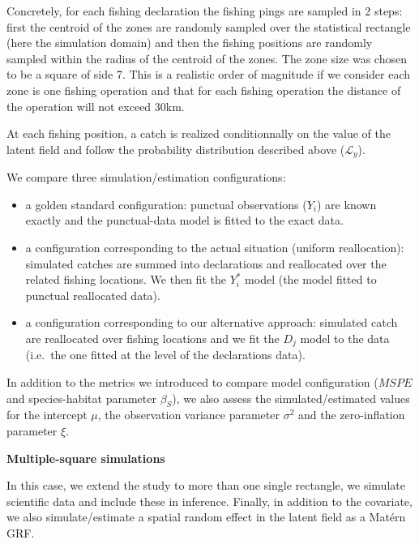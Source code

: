 \documentclass[
  english,
  man,floatsintext]{apa6}
\begin{document}
Concretely, for each fishing declaration the fishing pings are sampled in 2 steps: first the centroid of the zones are randomly sampled over the statistical rectangle (here the simulation domain) and then the fishing positions are randomly sampled within the radius of the centroid of the zones. The zone size was chosen to be a square of side 7. This is a realistic order of magnitude if we consider each zone is one fishing operation and that for each fishing operation the distance of the operation will not exceed 30km.

At each fishing position, a catch is realized conditionnally on the value of the latent field and follow the probability distribution described above (\(\mathcal{L}_y\)).

We compare three simulation/estimation configurations:

\begin{itemize}
\item
  a golden standard configuration: punctual observations (\(Y_i\)) are known exactly and the punctual-data model is fitted to the exact data.
\item
  a configuration corresponding to the actual situation (uniform reallocation): simulated catches are summed into declarations and reallocated over the related fishing locations. We then fit the \(Y_i^*\) model (the model fitted to punctual reallocated data).
\item
  a configuration corresponding to our alternative approach: simulated catch are reallocated over fishing locations and we fit the \(D_j\) model to the data (i.e.~the one fitted at the level of the declarations data).
\end{itemize}

In addition to the metrics we introduced to compare model configuration (\(MSPE\) and species-habitat parameter \(\beta_S\)), we also assess the simulated/estimated values for the intercept \(\mu\), the observation variance parameter \(\sigma^2\) and the zero-inflation parameter \(\xi\).

\textbf{Multiple-square simulations}

In this case, we extend the study to more than one single rectangle, we simulate scientific data and include these in inference. Finally, in addition to the covariate, we also simulate/estimate a spatial random effect in the latent field as a Matérn GRF.
\end{document}
